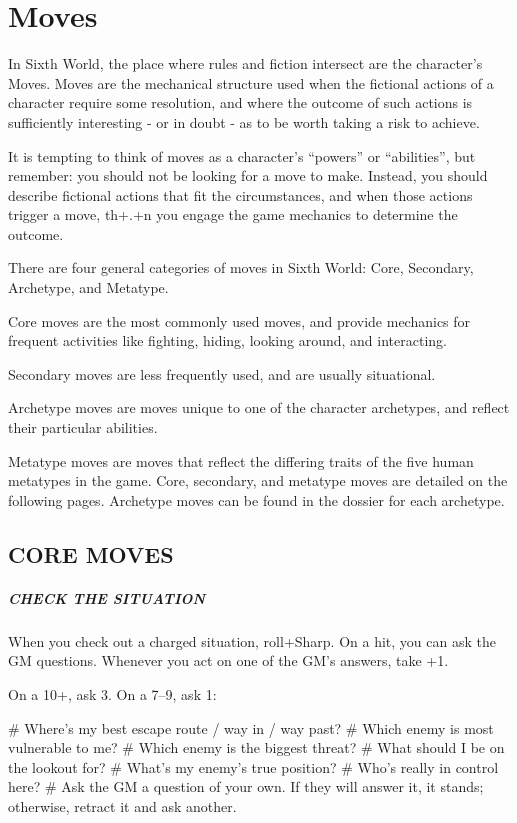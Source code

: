 \chapter{Moves} \label{moves}

In Sixth World, the place where rules and fiction intersect are the character’s Moves. Moves are the mechanical structure used when the fictional actions of a character require some resolution, and where the outcome of such actions is sufficiently interesting - or in doubt - as to be worth taking a risk to achieve.

It is tempting to think of moves as a character’s ``powers'' or ``abilities'', but remember: you should not be looking for a move to make. Instead, you should describe fictional actions that fit the circumstances, and when those actions trigger a move, th+.+n you engage the game mechanics to determine the outcome.

There are four general categories of moves in Sixth World: Core, Secondary, Archetype, and Metatype.

Core moves are the most commonly used moves, and provide mechanics for frequent activities like fighting, hiding, looking around, and interacting.

Secondary moves are less frequently used, and are usually situational.

Archetype moves are moves unique to one of the character archetypes, and reflect their particular abilities.

Metatype moves are moves that reflect the differing traits of the five human metatypes in the game. Core, secondary, and metatype moves are detailed on the following pages. Archetype moves can be found in the dossier for each archetype.

\section{CORE MOVES}

\paragraph{CHECK THE SITUATION}
When you check out a charged situation, roll+Sharp. On a hit, you can ask the GM questions. Whenever you act on one of the GM’s answers, take +1.

On a 10+, ask 3. On a 7–9, ask 1:

\begin{easylist}
    # Where’s my best escape route / way in / way past?
    # Which enemy is most vulnerable to me?
    # Which enemy is the biggest threat?
    # What should I be on the lookout for?
    # What’s my enemy’s true position?
    # Who’s really in control here?
    # Ask the GM a question of your own. If they will answer it, it stands; otherwise, retract it and ask another.
\end{easylist}


